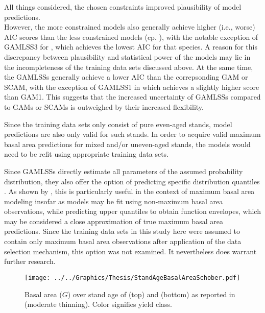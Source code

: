All things considered, the chosen constraints improved plausibility of model predictions.  \\
However, the more constrained models also generally achieve higher (i.e., worse) AIC scores than the less constrained models (cp. ), with the notable exception of GAMLSS3 for \Spruce{}, which achieves the lowest AIC for that species.  A reason for this discrepancy between plausibility and statistical power of the models may lie in the incompleteness of the training data sets discussed above.  At the same time, the GAMLSSs generally achieve a lower AIC than the correpsonding GAM or SCAM, with the exception of GAMLSS1 in \Spruce{} which achieves a slightly higher score than GAM1.  This suggests that the increased uncertainty of GAMLSSs compared to GAMs or SCAMs is outweighed by their increased flexibility.

Since the training data sets only consist of pure even-aged stands, model predictions are also only valid for such stands.  In order to acquire valid maximum basal area predictions for mixed and/or uneven-aged stands, the models would need to be refit using appropriate training data sets.

Since GAMLSSs directly estimate all parameters of the assumed probability distribution, they also offer the option of predicting specific distribution quantiles \parencite{Yee2004}.  As shown by \textcite{Woerdehoff2014}, this is particularly useful in the context of maximum basal area modeling insofar as models may be fit using non-maximum basal area observations, while predicting upper quantiles to obtain function envelopes, which may be considered a close approximation of true maximum basal area predictions.  Since the training data sets in this study here were assumed to contain only maximum basal area observations after application of the data selection mechanism, this option was not examined.  It nevertheless does warrant further research.

\begin{figure}[h]
  \centering
  \texttt{[image: ../../Graphics/Thesis/StandAgeBasalAreaSchober.pdf]}
  \caption{Basal area (\(G\)) over stand age of \Beech{} (top) and \Spruce{} (bottom) as reported in \textcite{Schober1995} (moderate thinning).  Color signifies yield class.}
  \label{fig:StandAgeBasalAreaSchober}
\end{figure}

